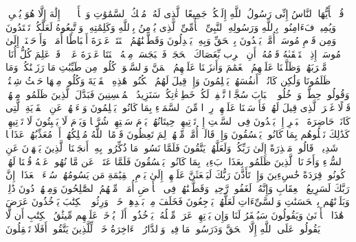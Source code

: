 \stopbuffer%
\startbuffer[\q:7:158]
قُلۡ یَٰۤأَیُّهَا ٱلنَّاسُ إِنِّی رَسُولُ ٱللَّهِ إِلَیۡكُمۡ جَمِیعًا ٱلَّذِی لَهُۥ مُلۡكُ ٱلسَّمَٰوَٰتِ وَٱلۡأَرۡضِۖ لَاۤ إِلَٰهَ إِلَّا هُوَ یُحۡیِۦ وَیُمِیتُۖ فَءَامِنُوا۟ بِٱللَّهِ وَرَسُولِهِ ٱلنَّبِیِّ ٱلۡأُمِّیِّ ٱلَّذِی یُؤۡمِنُ بِٱللَّهِ وَكَلِمَٰتِهِۦ وَٱتَّبِعُوهُ لَعَلَّكُمۡ تَهۡتَدُونَ%
\stopbuffer%
\startbuffer[\q:7:159]
وَمِن قَوۡمِ مُوسَىٰۤ أُمَّةࣱ یَهۡدُونَ بِٱلۡحَقِّ وَبِهِۦ یَعۡدِلُونَ%
\stopbuffer%
\startbuffer[\q:7:160]
وَقَطَّعۡنَٰهُمُ ٱثۡنَتَیۡ عَشۡرَةَ أَسۡبَاطًا أُمَمࣰاۚ وَأَوۡحَیۡنَاۤ إِلَىٰ مُوسَىٰۤ إِذِ ٱسۡتَسۡقَىٰهُ قَوۡمُهُۥۤ أَنِ ٱضۡرِب بِّعَصَاكَ ٱلۡحَجَرَۖ فَٱنۢبَجَسَتۡ مِنۡهُ ٱثۡنَتَا عَشۡرَةَ عَیۡنࣰاۖ قَدۡ عَلِمَ كُلُّ أُنَاسࣲ مَّشۡرَبَهُمۡۚ وَظَلَّلۡنَا عَلَیۡهِمُ ٱلۡغَمَٰمَ وَأَنزَلۡنَا عَلَیۡهِمُ ٱلۡمَنَّ وَٱلسَّلۡوَىٰۖ كُلُوا۟ مِن طَیِّبَٰتِ مَا رَزَقۡنَٰكُمۡۚ وَمَا ظَلَمُونَا وَلَٰكِن كَانُوۤا۟ أَنفُسَهُمۡ یَظۡلِمُونَ%
\stopbuffer%
\startbuffer[\q:7:161]
وَإِذۡ قِیلَ لَهُمُ ٱسۡكُنُوا۟ هَٰذِهِ ٱلۡقَرۡیَةَ وَكُلُوا۟ مِنۡهَا حَیۡثُ شِئۡتُمۡ وَقُولُوا۟ حِطَّةࣱ وَٱدۡخُلُوا۟ ٱلۡبَابَ سُجَّدࣰا نَّغۡفِرۡ لَكُمۡ خَطِیۤءَٰتِكُمۡۚ سَنَزِیدُ ٱلۡمُحۡسِنِینَ%
\stopbuffer%
\startbuffer[\q:7:162]
فَبَدَّلَ ٱلَّذِینَ ظَلَمُوا۟ مِنۡهُمۡ قَوۡلًا غَیۡرَ ٱلَّذِی قِیلَ لَهُمۡ فَأَرۡسَلۡنَا عَلَیۡهِمۡ رِجۡزࣰا مِّنَ ٱلسَّمَاۤءِ بِمَا كَانُوا۟ یَظۡلِمُونَ%
\stopbuffer%
\startbuffer[\q:7:163]
وَسۡءَلۡهُمۡ عَنِ ٱلۡقَرۡیَةِ ٱلَّتِی كَانَتۡ حَاضِرَةَ ٱلۡبَحۡرِ إِذۡ یَعۡدُونَ فِی ٱلسَّبۡتِ إِذۡ تَأۡتِیهِمۡ حِیتَانُهُمۡ یَوۡمَ سَبۡتِهِمۡ شُرَّعࣰا وَیَوۡمَ لَا یَسۡبِتُونَ لَا تَأۡتِیهِمۡۚ كَذَٰلِكَ نَبۡلُوهُم بِمَا كَانُوا۟ یَفۡسُقُونَ%
\stopbuffer%
\startbuffer[\q:7:164]
وَإِذۡ قَالَتۡ أُمَّةࣱ مِّنۡهُمۡ لِمَ تَعِظُونَ قَوۡمًا ٱللَّهُ مُهۡلِكُهُمۡ أَوۡ مُعَذِّبُهُمۡ عَذَابࣰا شَدِیدࣰاۖ قَالُوا۟ مَعۡذِرَةً إِلَىٰ رَبِّكُمۡ وَلَعَلَّهُمۡ یَتَّقُونَ%
\stopbuffer%
\startbuffer[\q:7:165]
فَلَمَّا نَسُوا۟ مَا ذُكِّرُوا۟ بِهِۦۤ أَنجَیۡنَا ٱلَّذِینَ یَنۡهَوۡنَ عَنِ ٱلسُّوۤءِ وَأَخَذۡنَا ٱلَّذِینَ ظَلَمُوا۟ بِعَذَابِۭ بَءِیسِۭ بِمَا كَانُوا۟ یَفۡسُقُونَ%
\stopbuffer%
\startbuffer[\q:7:166]
فَلَمَّا عَتَوۡا۟ عَن مَّا نُهُوا۟ عَنۡهُ قُلۡنَا لَهُمۡ كُونُوا۟ قِرَدَةً خَٰسِءِینَ%
\stopbuffer%
\startbuffer[\q:7:167]
وَإِذۡ تَأَذَّنَ رَبُّكَ لَیَبۡعَثَنَّ عَلَیۡهِمۡ إِلَىٰ یَوۡمِ ٱلۡقِیَٰمَةِ مَن یَسُومُهُمۡ سُوۤءَ ٱلۡعَذَابِۗ إِنَّ رَبَّكَ لَسَرِیعُ ٱلۡعِقَابِ وَإِنَّهُۥ لَغَفُورࣱ رَّحِیمࣱ%
\stopbuffer%
\startbuffer[\q:7:168]
وَقَطَّعۡنَٰهُمۡ فِی ٱلۡأَرۡضِ أُمَمࣰاۖ مِّنۡهُمُ ٱلصَّٰلِحُونَ وَمِنۡهُمۡ دُونَ ذَٰلِكَۖ وَبَلَوۡنَٰهُم بِٱلۡحَسَنَٰتِ وَٱلسَّیِّءَاتِ لَعَلَّهُمۡ یَرۡجِعُونَ%
\stopbuffer%
\startbuffer[\q:7:169]
فَخَلَفَ مِنۢ بَعۡدِهِمۡ خَلۡفࣱ وَرِثُوا۟ ٱلۡكِتَٰبَ یَأۡخُذُونَ عَرَضَ هَٰذَا ٱلۡأَدۡنَىٰ وَیَقُولُونَ سَیُغۡفَرُ لَنَا وَإِن یَأۡتِهِمۡ عَرَضࣱ مِّثۡلُهُۥ یَأۡخُذُوهُۚ أَلَمۡ یُؤۡخَذۡ عَلَیۡهِم مِّیثَٰقُ ٱلۡكِتَٰبِ أَن لَّا یَقُولُوا۟ عَلَى ٱللَّهِ إِلَّا ٱلۡحَقَّ وَدَرَسُوا۟ مَا فِیهِۗ وَٱلدَّارُ ٱلۡءَاخِرَةُ خَیۡرࣱ لِّلَّذِینَ یَتَّقُونَۚ أَفَلَا تَعۡقِلُونَ%
